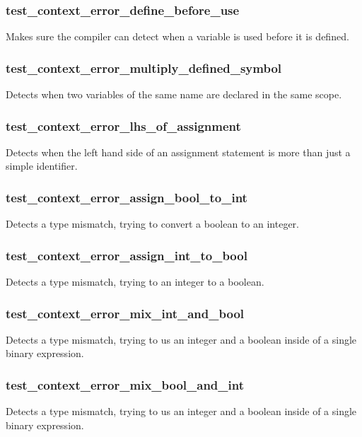 \documentclass{report}
\begin{document}
\subsubsection*{test\_context\_error\_define\_before\_use}

Makes sure the compiler can detect when a variable is used before it
is defined.

\subsubsection*{test\_context\_error\_multiply\_defined\_symbol}

Detects when two variables of the same name are declared in the same
scope.

\subsubsection*{test\_context\_error\_lhs\_of\_assignment}

Detects when the left hand side of an assignment statement is more
than just a simple identifier.

\subsubsection*{test\_context\_error\_assign\_bool\_to\_int}

Detects a type mismatch, trying to convert a boolean to an integer.

\subsubsection*{test\_context\_error\_assign\_int\_to\_bool}

Detects a type mismatch, trying to an integer to a boolean.

\subsubsection*{test\_context\_error\_mix\_int\_and\_bool}

Detects a type mismatch, trying to us an integer and a boolean
inside of a single binary expression.

\subsubsection*{test\_context\_error\_mix\_bool\_and\_int}

Detects a type mismatch, trying to us an integer and a boolean
inside of a single binary expression.
\end{document}
